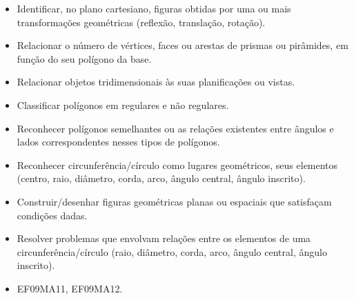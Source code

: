 \begin{escolha}
{{{\begin{escolha}
{{{\begin{itemize}
  \item Identificar, no plano cartesiano, figuras obtidas por uma ou mais
transformações geométricas (reflexão, translação, rotação).
  \item Relacionar o número de vértices, faces ou arestas de prismas ou
pirâmides, em função do seu polígono da base.
  \item Relacionar objetos tridimensionais às suas planificações ou vistas.
  \item Classificar polígonos em regulares e não regulares.
  \item Reconhecer polígonos semelhantes ou as relações existentes entre
ângulos e lados correspondentes nesses tipos de polígonos.
  \item Reconhecer circunferência/círculo como lugares geométricos, seus
elementos (centro, raio, diâmetro, corda, arco, ângulo central, ângulo
inscrito).
  \item Construir/desenhar figuras geométricas planas ou espaciais que
satisfaçam condições dadas.
  \item Resolver problemas que envolvam relações entre os elementos de uma
circunferência/círculo (raio, diâmetro, corda, arco, ângulo central, ângulo
inscrito).

\end{itemize} 


\begin{itemize}
  \item EF09MA11, EF09MA12.
\end{itemize}

}}}
\end{escolha}}}}
\end{escolha}
